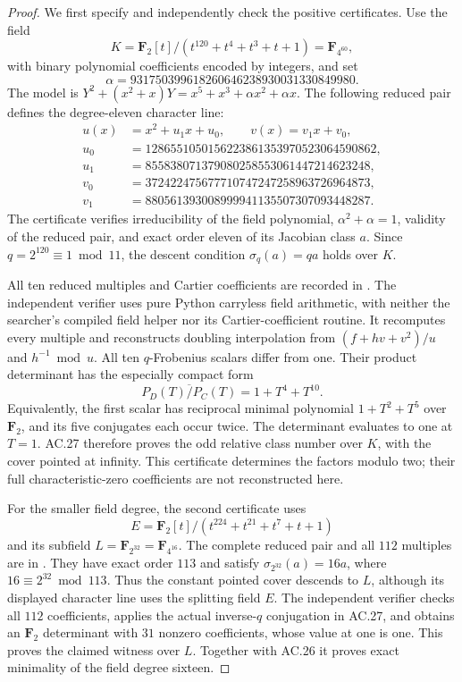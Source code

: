 \begin{proof}
We first specify and independently check the positive certificates.
Use the field
\[
 K=\mathbf F_2[t]/(t^{120}+t^4+t^3+t+1)=\mathbf F_{4^{60}},
\]
with binary polynomial coefficients encoded by integers, and set
\[
 \alpha=931750399618260646238930031330849980.
\]
The model is $Y^2+(x^2+x)Y=x^5+x^3+\alpha x^2+\alpha x$.
The following reduced pair defines the degree-eleven character line:
\[
 \begin{aligned}
 u(x)&=x^2+u_1x+u_0,\qquad v(x)=v_1x+v_0,\\
 u_0&=1286551050156223861353970523064590862,\\
 u_1&=855838071379080258553061447214623248,\\
 v_0&=372422475677710747247258963726964873,\\
 v_1&=880561393008999941135507307093448287.
 \end{aligned}
\]
The certificate verifies irreducibility of the field polynomial,
$\alpha^2+\alpha=1$, validity of the reduced pair, and exact order
eleven of its Jacobian class $a$. Since $q=2^{120}\equiv1\bmod11$,
the descent condition $\sigma_q(a)=qa$ holds over $K$.

All ten reduced multiples and Cartier coefficients are recorded in
.
The independent verifier  uses
pure Python carryless field arithmetic, with neither the searcher's
compiled field helper nor its Cartier-coefficient routine.
It recomputes every multiple and reconstructs doubling interpolation
from $(f+hv+v^2)/u$ and $h^{-1}\bmod u$.
All ten $q$-Frobenius scalars differ from one. Their product
determinant has the especially compact form
\[
          \overline{P_D(T)/P_C(T)}=1+T^4+T^{10}.
\]
Equivalently, the first scalar has reciprocal minimal polynomial
$1+T^2+T^5$ over $\mathbf F_2$, and its five conjugates each occur
twice. The determinant evaluates to one at $T=1$.
AC.27 therefore proves the odd relative class number over $K$,
with the cover pointed at infinity. This certificate determines
the factors modulo two; their full characteristic-zero coefficients
are not reconstructed here.

For the smaller field degree, the second certificate uses
\[
 E=\mathbf F_2[t]/(t^{224}+t^{21}+t^7+t+1)
\]
and its subfield $L=\mathbf F_{2^{32}}=\mathbf F_{4^{16}}$.
The complete reduced pair and all $112$ multiples are in
.
They have exact order $113$ and satisfy $\sigma_{2^{32}}(a)=16a$,
where $16\equiv2^{32}\bmod113$.
Thus the constant pointed cover descends to $L$, although its
displayed character line uses the splitting field $E$.
The independent verifier checks all $112$ coefficients, applies
the actual inverse-$q$ conjugation in AC.27, and obtains an
$\mathbf F_2$ determinant with $31$ nonzero coefficients, whose
value at one is one. This proves the claimed witness over $L$.
Together with AC.26 it proves exact minimality of the field degree
sixteen.


\end{proof}
